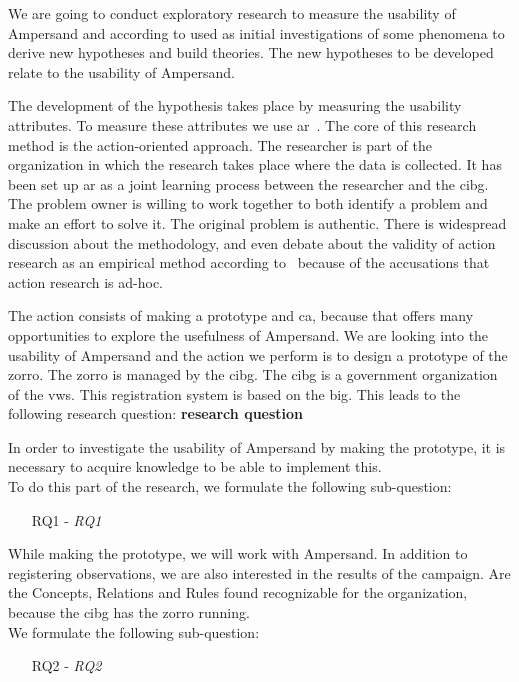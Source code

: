 We are going to conduct exploratory research to measure the usability of Ampersand and according to \cite{Easterbrook} used as initial investigations of some phenomena to derive new hypotheses and build theories.
The new hypotheses to be developed relate to the usability of Ampersand.

The development of the hypothesis takes place by measuring the usability attributes.
To measure these attributes we use \acrshort{ar}~\citep{Easterbrook}.
The core of this research method is the action-oriented approach.
The researcher is part of the organization in which the research takes place where the data is collected.
It has been set up \acrshort{ar} as a joint learning process between the researcher and the \acrshort{cibg}.
The problem owner is willing to work together to both identify a problem and make an effort to solve it.
The original problem is authentic.
There is widespread discussion about the methodology, and even debate about the validity of action research as an empirical method according to~\cite{Easterbrook} because of the accusations that action research is ad-hoc.

The action consists of making a prototype and \acrshort{ca}, because that offers many opportunities to explore the usefulness of Ampersand.
We are looking into the usability of Ampersand and the action we perform is to design a prototype of the \acrshort{zorro}.
The \acrshort{zorro} is managed by the \acrshort{cibg}.
The \acrshort{cibg} is a government organization of the \acrlong{vws}.
This registration system is based on the \acrshort{big}.
This leads to the following research question:
\newline
\textbf{\acrlong{research question}}

In order to investigate the usability of Ampersand by making the prototype, it is necessary to acquire knowledge to be able to implement this.
\\To do this part of the research, we formulate the following sub-question:
\begin{enumerate}
    \item[RQ1]- \textit{\acrlong{RQ1}}
\end{enumerate}

While making the prototype, we will work with Ampersand.
In addition to registering observations, we are also interested in the results of the campaign.
Are the Concepts, Relations and Rules found recognizable for the organization, because the \acrshort{cibg} has the \acrshort{zorro} running.
\\We formulate the following sub-question:
\begin{enumerate}
    \item[RQ2]- \textit{\acrlong{RQ2}}
\end{enumerate}

